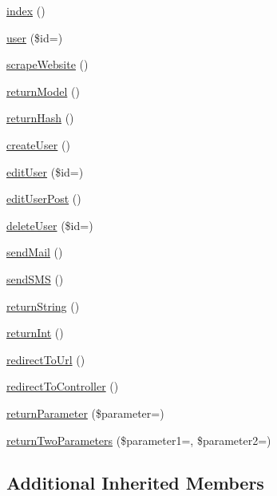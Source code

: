 \begin{DoxyCompactItemize}
\item 
\hyperlink{class_basic_a149eb92716c1084a935e04a8d95f7347}{index} ()
\item 
\hyperlink{class_basic_a6603546e99f9519b86989be128736ad6}{user} (\$id=\textquotesingle{}\textquotesingle{})
\item 
\hyperlink{class_basic_a48ffe9a27b91ce968b2bcf5e0a9d4069}{scrape\+Website} ()
\item 
\hyperlink{class_basic_a7cb6a02987f0faaef2ee4aff9198907e}{return\+Model} ()
\item 
\hyperlink{class_basic_a16df2136bd66a75022f350d583e6c060}{return\+Hash} ()
\item 
\hyperlink{class_basic_a967982ee98f05287bbdba812f6016947}{create\+User} ()
\item 
\hyperlink{class_basic_acd3b430aeceba0ebbda62330838d0c0b}{edit\+User} (\$id=\textquotesingle{}\textquotesingle{})
\item 
\hyperlink{class_basic_a445a1f2f42c756bf451de087e36b7193}{edit\+User\+Post} ()
\item 
\hyperlink{class_basic_a934aeeec370d904f3a58bde4d514259d}{delete\+User} (\$id=\textquotesingle{}\textquotesingle{})
\item 
\hyperlink{class_basic_a1f753d67be418d065282360fc5231d05}{send\+Mail} ()
\item 
\hyperlink{class_basic_a624b6482127c1e3ea78392e7e93db949}{send\+S\+MS} ()
\item 
\hyperlink{class_basic_a5bb666dcea19a9561c2047cfa25936bd}{return\+String} ()
\item 
\hyperlink{class_basic_a8d2918087022004ef5ad62d8f76a73d7}{return\+Int} ()
\item 
\hyperlink{class_basic_abf786273f796a96f5532dc60f9cec813}{redirect\+To\+Url} ()
\item 
\hyperlink{class_basic_a53f01fc4c43d1cecc497d9645f920407}{redirect\+To\+Controller} ()
\item 
\hyperlink{class_basic_ac380e8a432563c6affcfddd43384c1d2}{return\+Parameter} (\$parameter=\textquotesingle{}\textquotesingle{})
\item 
\hyperlink{class_basic_a2ef87b96abcca966a41e34d077fcc38e}{return\+Two\+Parameters} (\$parameter1=\textquotesingle{}\textquotesingle{}, \$parameter2=\textquotesingle{}\textquotesingle{})
\end{DoxyCompactItemize}
\subsection*{Additional Inherited Members}


